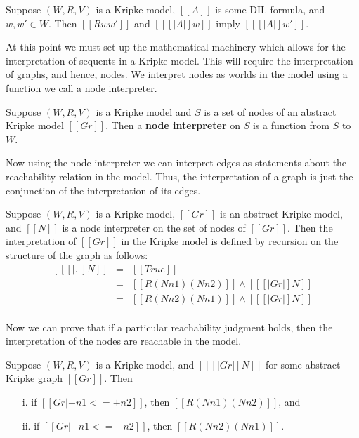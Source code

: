 \begin{lemma}[Monotonicity]
  \label{lemma:monotonicity}
  Suppose $(W, R, V)$ is a Kripke model, $[[A]]$ is some DIL formula, and $w,w' \in W$.
  Then $[[R w w']]$ and $[[ [| A |] w]]$ imply $[[ [| A |] w']]$.
\end{lemma}

At this point we must set up the mathematical machinery which allows
for the interpretation of sequents in a Kripke model.  This will
require the interpretation of graphs, and hence, nodes.  We interpret
nodes as worlds in the model using a function we call a node
interpreter.
\begin{definition}
  \label{def:node_interpreter}
  Suppose $(W, R, V)$ is a Kripke model and $S$ is a set of nodes of
  an abstract Kripke model $[[Gr]]$.  Then a \textbf{node interpreter} on
  $S$ is a function from $S$ to $W$.
\end{definition}
Now using the node interpreter we can interpret edges as statements
about the reachability relation in the model.  Thus, the
interpretation of a graph is just the conjunction of the
interpretation of its edges.
\begin{definition}
  \label{def:graph_interp}
  Suppose $(W, R, V)$ is a Kripke model, $[[Gr]]$ is an abstract Kripke
  model, and $[[N]]$ is a node interpreter on the set of nodes of $[[Gr]]$.
  Then the interpretation of
  $[[Gr]]$ in the Kripke model is defined by recursion on the structure
  of the graph as follows:
  \[
  \begin{array}{lll}
    [[ [| . |] N ]]            & = & [[True]]\\
    [[ [| n1 <=+ n2, Gr |] N]] & = & [[R (N n1) (N n2)]] \land [[ [| Gr |] N]]\\
    [[ [| n1 <=- n2, Gr |] N]] & = & [[R (N n2) (N n1)]] \land [[ [| Gr |] N]]\\
  \end{array}
  \]
\end{definition}
Now we can prove that if a particular reachability judgment holds,
then the interpretation of the nodes are reachable in the model.
\begin{lemma}
  \label{lemma:reachability_interpretation}
  Suppose $(W, R, V)$ is a Kripke model, and $[[ [| Gr |] N]]$ for some abstract Kripke graph $[[Gr]]$. Then
  \begin{itemize}
  \item[i.] if $[[Gr |- n1 <=+ n2]]$, then $[[R (N n1) (N n2)]]$, and
  \item[ii.] if $[[Gr |- n1 <=- n2]]$, then $[[R (N n2) (N n1)]]$.
  \end{itemize}
\end{lemma}


